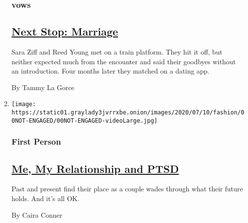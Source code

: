 \begin{enumerate}
  \hypertarget{vows-1}{%
  \subsubsection{vows}\label{vows-1}}

  \hypertarget{next-stop-marriage}{%
  \subsection{\texorpdfstring{\href{/2020/07/24/fashion/weddings/Sara-Ziff-marries-Reed-Young-at-train-station.html}{Next
  Stop: Marriage}}{Next Stop: Marriage}}\label{next-stop-marriage}}

  Sara Ziff and Reed Young met on a train platform. They hit it off, but
  neither expected much from the encounter and said their goodbyes
  without an introduction. Four months later they matched on a dating
  app.

  By Tammy La Gorce
\item
  \texttt{[image: https://static01.graylady3jvrrxbe.onion/images/2020/07/10/fashion/00NOT-ENGAGED/00NOT-ENGAGED-videoLarge.jpg]}

  \hypertarget{first-person}{%
  \subsubsection{First Person}\label{first-person}}

  \hypertarget{me-my-relationship-and-ptsd}{%
  \subsection{\texorpdfstring{\href{/2020/07/25/fashion/weddings/me-my-relationship-and-ptsd.html}{Me,
  My Relationship and
  PTSD}}{Me, My Relationship and PTSD}}\label{me-my-relationship-and-ptsd}}

  Past and present find their place as a couple wades through what their
  future holds. And it's all OK.

  By Caira Conner
\end{enumerate}

